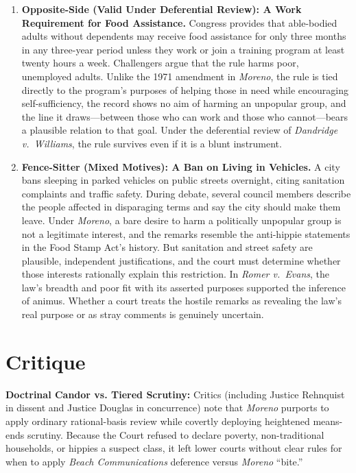 \documentclass[12pt]{article}
\begin{document}
\begin{enumerate}
\item \textbf{Opposite-Side (Valid Under Deferential Review): A Work Requirement for Food Assistance.} Congress provides that able-bodied adults without dependents may receive food assistance for only three months in any three-year period unless they work or join a training program at least twenty hours a week. Challengers argue that the rule harms poor, unemployed adults. Unlike the 1971 amendment in \textit{Moreno}, the rule is tied directly to the program's purposes of helping those in need while encouraging self-sufficiency, the record shows no aim of harming an unpopular group, and the line it draws---between those who can work and those who cannot---bears a plausible relation to that goal. Under the deferential review of \textit{Dandridge v.\ Williams}, the rule survives even if it is a blunt instrument.

\item \textbf{Fence-Sitter (Mixed Motives): A Ban on Living in Vehicles.} A city bans sleeping in parked vehicles on public streets overnight, citing sanitation complaints and traffic safety. During debate, several council members describe the people affected in disparaging terms and say the city should make them leave. Under \textit{Moreno}, a bare desire to harm a politically unpopular group is not a legitimate interest, and the remarks resemble the anti-hippie statements in the Food Stamp Act's history. But sanitation and street safety are plausible, independent justifications, and the court must determine whether those interests rationally explain this restriction. In \textit{Romer v.\ Evans}, the law's breadth and poor fit with its asserted purposes supported the inference of animus. Whether a court treats the hostile remarks as revealing the law's real purpose or as stray comments is genuinely uncertain.

\end{enumerate}

\section{Critique}
\textbf{Doctrinal Candor vs. Tiered Scrutiny:} Critics (including Justice Rehnquist in dissent and Justice Douglas in concurrence) note that \textit{Moreno} purports to apply ordinary rational-basis review while covertly deploying heightened means-ends scrutiny. Because the Court refused to declare poverty, non-traditional households, or hippies a suspect class, it left lower courts without clear rules for when to apply \textit{Beach Communications} deference versus \textit{Moreno} ``bite.''
\end{document}
